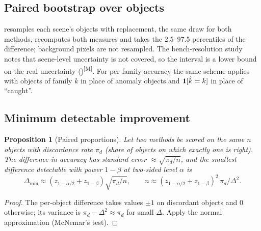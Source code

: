 \documentclass[11pt,a4paper]{article}
\theoremstyle{plain}
\newtheorem{proposition}{Proposition}[section]
\theoremstyle{definition}
\theoremstyle{remark}
\newcommand{\meas}{\textsuperscript{\textsf{\scriptsize[M]}}}
\begin{document}
\subsection{Paired bootstrap over objects}

 resamples each scene's objects with replacement, the same draw for both methods, recomputes
both measures and takes the 2.5--97.5 percentiles of the difference; background pixels are not resampled. The bench-resolution
study notes that scene-level uncertainty is not covered, so the interval is a lower bound on the real uncertainty
()\meas. For per-family accuracy the same scheme applies with objects of
family $k$ in place of anomaly objects and $\bm{1}[\hat k=k]$ in place of ``caught''.

\subsection{Minimum detectable improvement}

\begin{proposition}[Paired proportions]
\label{prop:mcnemar}
Let two methods be scored on the same $n$ objects with discordance rate $\pi_d$ (share of objects on which exactly one is right).
The difference in accuracy has standard error $\approx\sqrt{\pi_d/n}$, and the smallest difference detectable with power $1-\beta$ at
two-sided level $\alpha$ is
\[
  \Delta_{\min}\approx(z_{1-\alpha/2}+z_{1-\beta})\sqrt{\pi_d/n},\qquad
  n\approx(z_{1-\alpha/2}+z_{1-\beta})^2\,\pi_d/\Delta^2 .
\]
\end{proposition}
\begin{proof}
The per-object difference takes values $\pm1$ on discordant objects and 0 otherwise; its variance is $\pi_d-\Delta^2\approx\pi_d$
for small $\Delta$. Apply the normal approximation (McNemar's test).
\end{proof}
\end{document}
